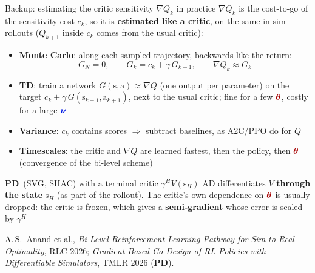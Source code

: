 \documentclass[lecture]{beamer}
\newcommand{\vect}[1]{\ensuremath{\boldsymbol{\mathrm{#1}}}}
\newcommand{\mth}{\textcolor{myRed2}{\vect\theta}}
\newcommand{\pnu}{\textcolor{myBlue3}{\vect\nu}}
\newcommand{\sv}{\vect s}
\newcommand{\av}{\vect a}
\newcommand{\PD}{\textcolor{myGreen3}{\textbf{PD}}}
\begin{document}
\begin{frame}[noframenumbering]{\normalsize Backup: estimating the critic sensitivity $\nabla Q_k$ in practice}
\footnotesize
$\nabla Q_k$ is the cost-to-go of the sensitivity cost $c_k$, so it is \textbf{estimated like a critic}, on the same in-sim rollouts ($Q_{k+1}$ inside $c_k$ comes from the usual critic):
\begin{itemize}
\setlength{\itemsep}{3pt}
\item \textbf{Monte Carlo}: along each sampled trajectory, backwards like the return:
\[G_N=0,\qquad G_k=c_k+\gamma\,G_{k+1},\qquad \nabla Q_k\approx G_k\]
\vspace{-.5cm}
\item \textbf{TD}: train a network $G(\sv,\av)\approx\nabla Q$ (one output per parameter) on the target $c_k+\gamma\,G(\sv_{k+1},\av_{k+1})$, next to the usual critic; fine for a few $\mth$, costly for a large $\pnu$
\item \textbf{Variance}: $c_k$ contains scores $\Rightarrow$ subtract baselines, as A2C/PPO do for $Q$
\item \textbf{Timescales}: the critic and $\nabla Q$ are learned fastest, then the policy, then $\mth$ (convergence of the bi-level scheme)
\end{itemize}
\vspace{.1cm}
\begin{block}{\footnotesize \PD\ (SVG, SHAC) with a terminal critic $\gamma^HV(\sv_H)$}
AD differentiates $V$ \textbf{through the state} $\sv_H$ (as part of the rollout). The critic's own dependence on $\mth$ is usually dropped: the critic is frozen, which gives a \textbf{semi-gradient} whose error is scaled by $\gamma^H$
\end{block}
\vfill
\parbox{0.95\textwidth}{\tiny A.\,S.~Anand et al., \textit{Bi-Level Reinforcement Learning Pathway for Sim-to-Real Optimality}, RLC 2026; \textit{Gradient-Based Co-Design of RL Policies with Differentiable Simulators}, TMLR 2026 (\PD).}
\end{frame}
\end{document}

